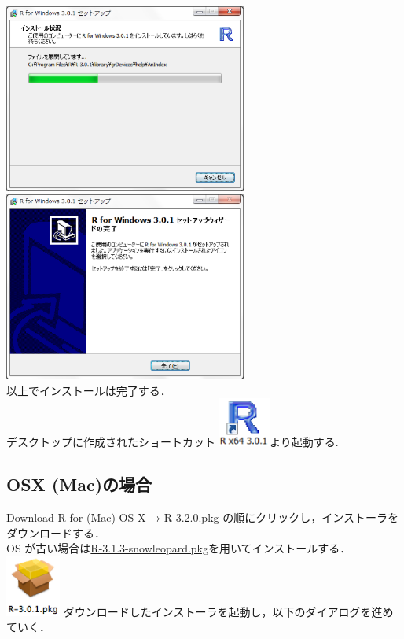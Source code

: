 \documentclass[a4paper,10pt,fleqn]{jarticle}
\begin{document}
\includegraphics[width=8cm]{img/windows/win010.eps}\hspace{0.8em} \includegraphics[width=8cm]{img/windows/win011.eps}\\

以上でインストールは完了する．\\

デスクトップに作成されたショートカット \includegraphics[width=1.7cm]{img/windows/win012.eps}より起動する.
\subsection{OSX (Mac)の場合}
\underline{Download R for (Mac) OS X} → \underline{R-3.2.0.pkg} の順にクリックし，インストーラをダウンロードする．\\
OS が古い場合は\underline{R-3.1.3-snowleopard.pkg}を用いてインストールする．
\includegraphics[width=1.8cm]{img/osx/osx001.eps} ダウンロードしたインストーラを起動し，以下のダイアログを進めていく．\\
\end{document}
